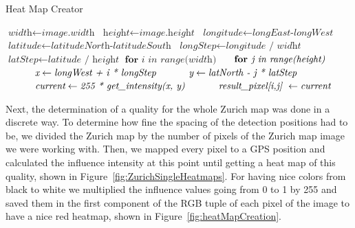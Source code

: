 \documentclass[letterpaper]{article}
\begin{document}
\begin{algorithm}
    \caption{Heat Map Creator}\label{fig:heatMapCreation}
    \begin{algorithmic}[1]
        	 \State $\textit{width} \gets \textit{image.width}$
        	 \State $\textit{height} \gets \textit{image.height}$
        	 \State $\textit{longitude} \gets \textit{longEast-longWest}$
        	 \State $\textit{latitude} \gets \textit{latitudeNorth-latitudeSouth}$
            \State $\textit{longStep} \gets \textit{longitude / widht}$
            \State $\textit{latStep} \gets \textit{latitude / height}$
            \State $\textbf{for } \textit{i in range(width)} $
            \State $\indent \textbf{for } \textit{j in range(height)} $
            \State $\indent \indent \textit{x} \gets \textit{longWest + i * longStep}$
            \State $\indent \indent \textit{y} \gets \textit{latNorth - j * latStep}$
            \State $\indent \indent \textit{current} \gets \textit{255 * get\_intensity(x, y)}$
            \State $\indent \indent \textit{result\_pixel[i,j] } \gets \textit{current}$
        \EndProcedure
    \end{algorithmic}
\end{algorithm}

\indent Next, the determination of a quality for the whole Zurich map was done in a discrete way. 
To determine how fine the spacing of the detection positions had to be, we divided the Zurich map 
by the number of pixels of the Zurich map image we were working with. Then, we mapped every pixel 
to a GPS position and calculated the influence intensity at this point until getting a heat map 
of this quality, shown in Figure~\ref{fig:ZurichSingleHeatmaps}. For having nice colors from black 
to white we multiplied the influence values going from 0 to 1 by 255 and saved them in the first component 
of the RGB tuple of each pixel of the image to have a nice red heatmap, shown in Figure~\ref{fig:heatMapCreation}.
\end{document}
